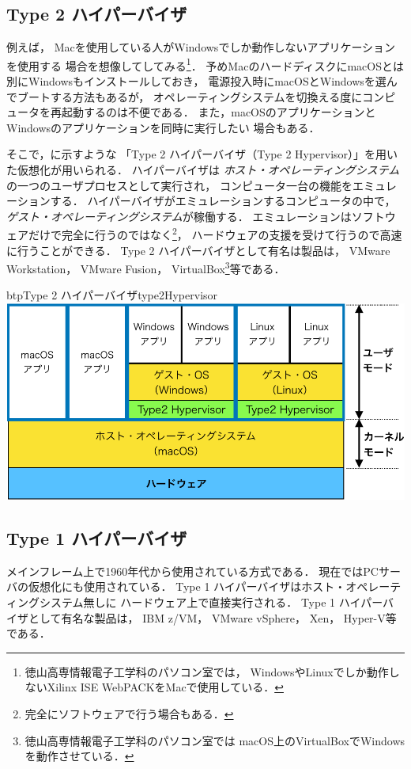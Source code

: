 \subsection{Type 2 ハイパーバイザ}
例えば，
Macを使用している人がWindowsでしか動作しないアプリケーションを使用する
場合を想像してしてみる\footnote{
  徳山高専情報電子工学科のパソコン室では，
  WindowsやLinuxでしか動作しないXilinx ISE WebPACKをMacで使用している．}．
予めMacのハードディスクにmacOSとは別にWindowsもインストールしておき，
電源投入時にmacOSとWindowsを選んでブートする方法もあるが，
オペレーティングシステムを切換える度にコンピュータを再起動するのは不便である．
また，macOSのアプリケーションとWindowsのアプリケーションを同時に実行したい
場合もある．

そこで，に示すような
「Type 2 ハイパーバイザ（Type 2 Hypervisor）」を用いた仮想化が用いられる．
ハイパーバイザは
\emph{ホスト・オペレーティングシステム}の一つのユーザプロセスとして実行され，
コンピュータ一台の機能をエミュレーションする．
ハイパーバイザがエミュレーションするコンピュータの中で，
\emph{ゲスト・オペレーティングシステム}が稼働する．
エミュレーションはソフトウェアだけで完全に行うのではなく\footnote{
  完全にソフトウェアで行う場合もある．}，
ハードウェアの支援を受けて行うので高速に行うことができる\cite{virtualization}．
Type 2 ハイパーバイザとして有名は製品は，
VMware Workstation，
VMware Fusion，
VirtualBox\footnote{
  徳山高専情報電子工学科のパソコン室では
  macOS上のVirtualBoxでWindowsを動作させている．
}等である．

\begin{myfig}{btp}{Type 2 ハイパーバイザ}{type2Hypervisor}
  \includegraphics[scale=0.66]{Fig/type2Hypervisor-crop.pdf}
\end{myfig}

\subsection{Type 1 ハイパーバイザ}
メインフレーム上で1960年代から使用されている方式である．
現在ではPCサーバの仮想化にも使用されている．
Type 1 ハイパーバイザはホスト・オペレーティングシステム無しに
ハードウェア上で直接実行される．
Type 1 ハイパーバイザとして有名な製品は，
IBM z/VM，
VMware vSphere，
Xen，
Hyper-V等である．

